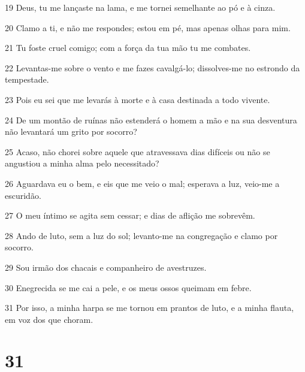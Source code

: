 \par 19 Deus, tu me lançaste na lama, e me tornei semelhante ao pó e à cinza.
\par 20 Clamo a ti, e não me respondes; estou em pé, mas apenas olhas para mim.
\par 21 Tu foste cruel comigo; com a força da tua mão tu me combates.
\par 22 Levantas-me sobre o vento e me fazes cavalgá-lo; dissolves-me no estrondo da tempestade.
\par 23 Pois eu sei que me levarás à morte e à casa destinada a todo vivente.
\par 24 De um montão de ruínas não estenderá o homem a mão e na sua desventura não levantará um grito por socorro?
\par 25 Acaso, não chorei sobre aquele que atravessava dias difíceis ou não se angustiou a minha alma pelo necessitado?
\par 26 Aguardava eu o bem, e eis que me veio o mal; esperava a luz, veio-me a escuridão.
\par 27 O meu íntimo se agita sem cessar; e dias de aflição me sobrevêm.
\par 28 Ando de luto, sem a luz do sol; levanto-me na congregação e clamo por socorro.
\par 29 Sou irmão dos chacais e companheiro de avestruzes.
\par 30 Enegrecida se me cai a pele, e os meus ossos queimam em febre.
\par 31 Por isso, a minha harpa se me tornou em prantos de luto, e a minha flauta, em voz dos que choram.

\chapter{31}


